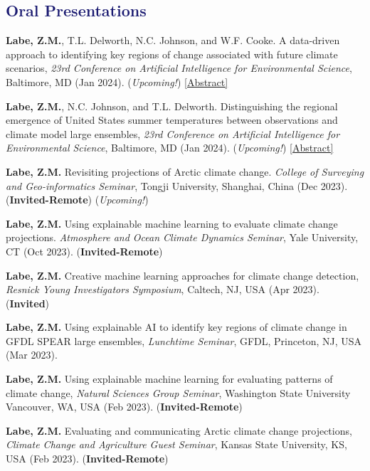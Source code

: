\documentclass[margin,line,palatino,courier,10pt]{res}
\begin{document}
\begin{resume}
\section{\sc \textcolor{MidnightBlue}{\large{\textbf{Oral Presentations}}}}
\begin{etaremune}[leftmargin=0in,topsep=0in,parsep=0in]
\item \textbf{Labe, Z.M.}, T.L. Delworth, N.C. Johnson, and W.F. Cooke. A data-driven approach to identifying key regions of change associated with future climate scenarios, \textit{23rd Conference on Artificial Intelligence for Environmental Science}, Baltimore, MD (Jan 2024). (\textit{Upcoming!}) \href{https://ams.confex.com/ams/104ANNUAL/meetingapp.cgi/Paper/431300}{[Abstract]}
\item \textbf{Labe, Z.M.}, N.C. Johnson, and T.L. Delworth. Distinguishing the regional emergence of United States summer temperatures between observations and climate model large ensembles, \textit{23rd Conference on Artificial Intelligence for Environmental Science}, Baltimore, MD (Jan 2024). (\textit{Upcoming!}) \href{https://ams.confex.com/ams/104ANNUAL/meetingapp.cgi/Paper/431288}{[Abstract]}
\item \textbf{Labe, Z.M.} Revisiting projections of Arctic climate change. \textit{College of Surveying and Geo-informatics Seminar}, Tongji University, Shanghai, China (Dec 2023). (\textbf{Invited-Remote}) (\textit{Upcoming!})
\item \textbf{Labe, Z.M.} Using explainable machine learning to evaluate climate change projections. \textit{Atmosphere and Ocean Climate Dynamics Seminar}, Yale University, CT (Oct 2023). (\textbf{Invited-Remote}) 
\item \textbf{Labe, Z.M.} Creative machine learning approaches for climate change detection, \textit{Resnick Young Investigators Symposium}, Caltech, NJ, USA (Apr 2023). (\textbf{Invited}) 
\item \textbf{Labe, Z.M.} Using explainable AI to identify key regions of climate change in GFDL SPEAR large ensembles, \textit{Lunchtime Seminar}, GFDL, Princeton, NJ, USA (Mar 2023). 
\item \textbf{Labe, Z.M.} Using explainable machine learning for evaluating patterns of climate change, \textit{Natural Sciences Group Seminar}, Washington State University Vancouver, WA, USA (Feb 2023). (\textbf{Invited-Remote})
\item \textbf{Labe, Z.M.} Evaluating and communicating Arctic climate change projections, \textit{Climate Change and Agriculture Guest Seminar}, Kansas State University, KS, USA (Feb 2023). (\textbf{Invited-Remote})

\end{etaremune}
\end{resume}
\end{document}
